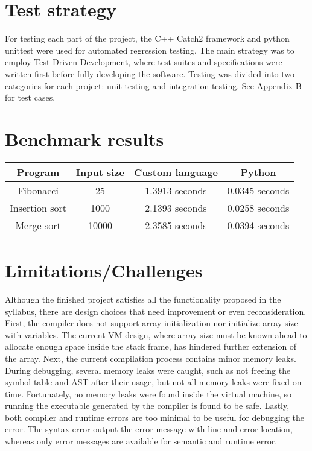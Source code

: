 \documentclass[manuscript,screen,nonacm]{acmart}
\begin{document}
\section{Test strategy}
For testing each part of the project, the C++ Catch2 framework and python unittest were used for automated regression testing. The main strategy was to employ Test Driven Development, where test suites and specifications were written first before fully developing the software\cite{OCW6.005}. Testing was divided into two categories for each project: unit testing and integration testing. See Appendix B for test cases.


\section{Benchmark results}

\begin{center}
\begin{tabular}{|c|c|c|c|}
    \hline
    Program & Input size & Custom language & Python \\
    \hline
    Fibonacci & 25 & 1.3913 seconds & 0.0345 seconds \\
    Insertion sort & 1000 & 2.1393 seconds & 0.0258 seconds \\
    Merge sort & 10000 & 2.3585 seconds & 0.0394 seconds \\
    \hline
\end{tabular}
\end{center}

\section{Limitations/Challenges}
Although the finished project satisfies all the functionality proposed in the syllabus, there are design choices that need improvement or even reconsideration. First, the compiler does not support array initialization nor initialize array size with variables. The current VM design, where array size must be known ahead to allocate enough space inside the stack frame, has hindered further extension of the array. Next, the current compilation process contains minor memory leaks. During debugging, several memory leaks were caught, such as not freeing the symbol table and AST after their usage, but not all memory leaks were fixed on time. Fortunately, no memory leaks were found inside the virtual machine, so running the executable generated by the compiler is found to be safe. Lastly, both compiler and runtime errors are too minimal to be useful for debugging the error. The syntax error output the error message with line and error location, whereas only error messages are available for semantic and runtime error. 
\end{document}
